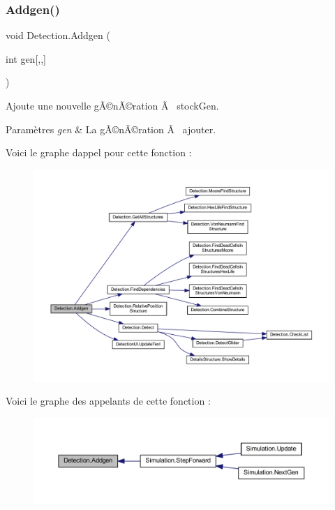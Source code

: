 \subsubsection{\texorpdfstring{Addgen()}{Addgen()}}
{\footnotesize\ttfamily void Detection.\+Addgen (\begin{DoxyParamCaption}\item[{int}]{gen\mbox{[},,\mbox{]} }\end{DoxyParamCaption})\hspace{0.3cm}{\ttfamily [inline]}}



Ajoute une nouvelle gÃ©nÃ©ration Ã  stock\+Gen. 


\begin{DoxyParams}{Paramètres}
{\em gen} & La gÃ©nÃ©ration Ã  ajouter.\\
\hline
\end{DoxyParams}
Voici le graphe d\textquotesingle{}appel pour cette fonction \+:
\nopagebreak
\begin{figure}[H]
\begin{center}
\leavevmode
\includegraphics[width=350pt]{class_detection_a92c60be1a69ea74b7f7bef04a0e53238_cgraph}
\end{center}
\end{figure}
Voici le graphe des appelants de cette fonction \+:
\nopagebreak
\begin{figure}[H]
\begin{center}
\leavevmode
\includegraphics[width=350pt]{class_detection_a92c60be1a69ea74b7f7bef04a0e53238_icgraph}
\end{center}
\end{figure}
\mbox{\label{class_detection_a96c6d9a8e299f137a4fb84d2ea80e092}} 

